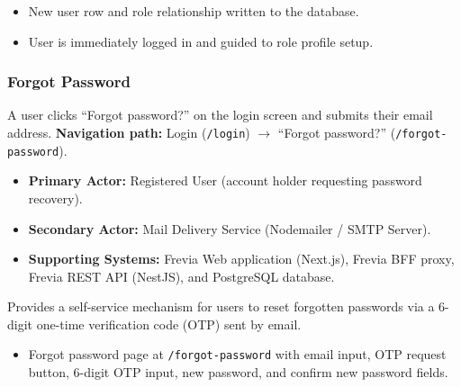 \begin{itemize}[leftmargin=1.6em,topsep=3pt,itemsep=2pt,parsep=0pt,label=$\bullet$]
    \item New user row and role relationship written to the database.
    \item User is immediately logged in and guided to role profile setup.
\end{itemize}

\subsubsection{ Forgot Password}

A user clicks ``Forgot password?'' on the login screen and submits their email address.\newline
\textbf{Navigation path:} Login (\texttt{/login}) $\rightarrow$ ``Forgot password?'' (\texttt{/forgot-password}).


\begin{itemize}[leftmargin=1.6em,topsep=3pt,itemsep=2pt,parsep=0pt,label=$\bullet$]
    \item \textbf{Primary Actor:} Registered User (account holder requesting password recovery).
    \item \textbf{Secondary Actor:} Mail Delivery Service (Nodemailer / SMTP Server).
    \item \textbf{Supporting Systems:} Frevia Web application (Next.js), Frevia BFF proxy, Frevia REST API (NestJS), and PostgreSQL database.
\end{itemize}

\noindent Provides a self-service mechanism for users to reset forgotten passwords via a 6-digit one-time verification code (OTP) sent by email.

\begin{itemize}[leftmargin=1.6em,topsep=3pt,itemsep=2pt,parsep=0pt,label=$\bullet$]
    \item Forgot password page at \texttt{/forgot-password} with email input, OTP request button, 6-digit OTP input, new password, and confirm new password fields.
\end{itemize}

